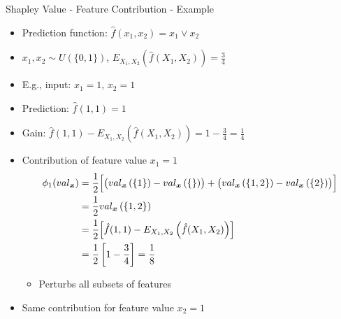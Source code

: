 \begin{frame}{Shapley Value - Feature Contribution - Example}
	\begin{itemize}
		\item Prediction function: $\hat{f}(x_1, x_2) = x_1 \lor x_2$
		\item $x_1, x_2 \sim U(\{0, 1\})$, $E_{X_1,X_2}(\hat{f}(X_1,X_2)) = \frac{3}{4}$
		\item E.g., input: $x_1 = 1$, $x_2 = 1$
		\item Prediction: $\hat{f}(1, 1) = 1$
		\item Gain: $\hat{f}(1, 1) - E_{X_1,X_2}(\hat{f}(X_1,X_2)) = 1 - \frac{3}{4} = \frac{1}{4}$
		\item Contribution of feature value $x_1 = 1$
		\begin{align}\begin{split}
				\phi_1(val_{\bm{x}})
				&=\frac{1}{2} \Bigl[\bigl(val_{\bm{x}}\left(\{1\}\right)-val_{\bm{x}}\left(\{\}\right)\bigr) + \bigl(val_{\bm{x}}\left(\{1, 2\}\right)-val_{\bm{x}}\left(\{2\}\right)\bigr)\Bigr]\\
				&=\frac{1}{2} val_{\bm{x}}\left(\{1, 2\}\right)\\
				&=\frac{1}{2} \Bigl[\hat{f}(1, 1) - E_{X_1,X_2}\left(\hat{f}(X_1,X_2)\right)\Bigr]\\
				&=\frac{1}{2} \left[1 - \frac{3}{4}\right] = \frac{1}{8}
		\end{split}\end{align}
		\vspace{-2em}
		\begin{itemize}
			\item Perturbs all subsets of features
		\end{itemize}
		\item Same contribution for feature value $x_2 = 1$
	\end{itemize}
\end{frame}



